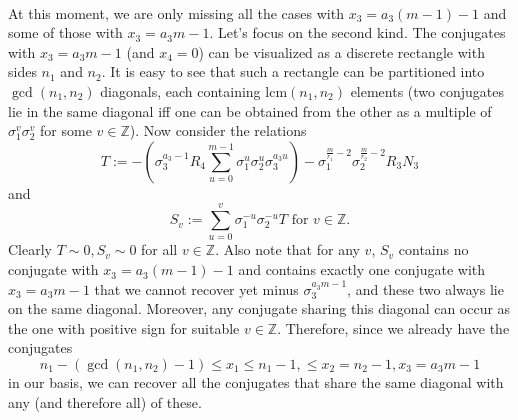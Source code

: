 \documentclass[12pt,a4paper]{article}
\newcommand{\Z}{\mathbb{Z}}
\newcommand{\lcm}{\mathrm{lcm}}
\begin{document}
\paragraph*{}
At this moment, we are only missing all the cases with $x_3=a_3(m-1)-1$ and some of those with $x_3=a_3m-1$. 
Let's focus on the second kind. The conjugates with $x_3=a_3m-1$ (and $x_4=0$) can be visualized as a discrete rectangle with sides $n_1$ and $n_2$. It is easy to see that such a rectangle can be partitioned into $\gcd(n_1,n_2)$ diagonals, each containing $\lcm(n_1,n_2)$ elements (two conjugates lie in the same diagonal iff one can be obtained from the other as a multiple of $\sigma_1^v\sigma_2^v$ for some $v\in\Z$). Now consider the relations $$T:=-\left(\sigma_3^{a_3-1}R_4\sum_{u=0}^{m-1}\sigma_1^{u}\sigma_2^{u}\sigma_3^{a_3u}\right)-\sigma_1^{\frac{m}{r_1}-2}\sigma_2^{\frac{m}{r_2}-2} R_3N_3$$
and
$$S_v:=\sum_{u=0}^{v}\sigma_1^{-u}\sigma_2^{-u}T \text{ for } v\in\Z.$$
Clearly $T\sim 0, S_v\sim 0$ for all $v\in\Z$. Also note that for any $v$, $S_v$ contains no conjugate with $x_3=a_3(m-1)-1$ and contains exactly one conjugate with $x_3=a_3m-1$ that we cannot recover yet minus $\sigma_3^{a_3m-1}$, and these two always lie on the same diagonal. Moreover, any conjugate sharing this diagonal can occur as the one with positive sign for suitable $v\in\Z$. Therefore, since we already have the conjugates $$n_1-(\gcd\left(n_1,n_2\right)-1)\leq x_1\leq n_1-1, \leq x_2=n_2-1, x_3=a_3m-1$$ in our basis, we can recover all the conjugates that share the same diagonal with any (and therefore all) of these.
\end{document}
